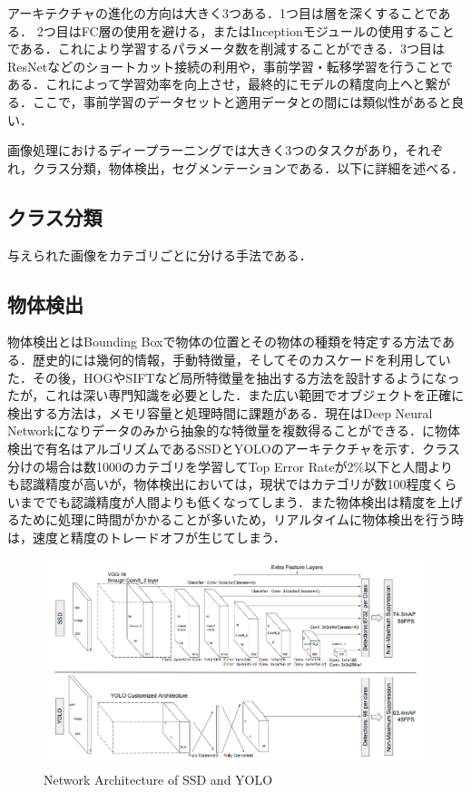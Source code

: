 アーキテクチャの進化の方向は大きく3つある．1つ目は層を深くすることである．
2つ目はFC層の使用を避ける，またはInceptionモジュールの使用することである．これにより学習するパラメータ数を削減することができる．3つ目はResNetなどのショートカット接続の利用や，事前学習・転移学習を行うことである．これによって学習効率を向上させ，最終的にモデルの精度向上へと繋がる．ここで，事前学習のデータセットと適用データとの間には類似性があると良い．

画像処理におけるディープラーニングでは大きく3つのタスクがあり，それぞれ，クラス分類，物体検出，セグメンテーションである．以下に詳細を述べる．

\subsection*{クラス分類}
与えられた画像をカテゴリごとに分ける手法である．

\subsection*{物体検出}
物体検出とはBounding Boxで物体の位置とその物体の種類を特定する方法である．歴史的には幾何的情報，手動特徴量，そしてそのカスケードを利用していた．その後，HOGやSIFTなど局所特徴量を抽出する方法を設計するようになったが，これは深い専門知識を必要とした．また広い範囲でオブジェクトを正確に検出する方法は，メモリ容量と処理時間に課題がある．現在はDeep Neural Networkになりデータのみから抽象的な特徴量を複数得ることができる．に物体検出で有名はアルゴリズムであるSSDとYOLOのアーキテクチャを示す．クラス分けの場合は数1000のカテゴリを学習してTop Error Rateが2\%以下と人間よりも認識精度が高いが，物体検出においては，現状ではカテゴリが数100程度くらいまででも認識精度が人間よりも低くなってしまう．また物体検出は精度を上げるために処理に時間がかかることが多いため，リアルタイムに物体検出を行う時は，速度と精度のトレードオフが生じてしまう．

\begin{figure}[H]
	\centering
	\includegraphics[width=0.7\linewidth]{fig/yolo_ssd.png}
	\caption{Network Architecture of SSD and YOLO}
	\label{fig:YOLO}
\end{figure}

